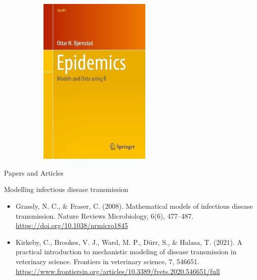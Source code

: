 \documentclass[
  ignorenonframetext,
]{beamer}
\begin{document}
\begin{frame}
\begin{figure}
\begin{minipage}{0.50\linewidth}
\begin{figure}[H]
{\centering \includegraphics[width=0.6\textwidth,height=\textheight]{images/Epidemics_Ottar.jpg}

}


\end{figure}%

\end{minipage}%

\end{figure}%
\end{frame}

\begin{frame}
\begin{block}{Papers and Articles}
\label{papers-and-articles}
\end{block}
\end{frame}

\begin{frame}
\begin{block}{Modelling infectious disease transmission}
\label{modelling-infectious-disease-transmission}
\begin{itemize}
\item
  Grassly, N. C., \& Fraser, C. (2008). Mathematical models of
  infectious disease transmission. Nature Reviews Microbiology, 6(6),
  477--487. \url{https://doi.org/10.1038/nrmicro1845}
\item
  Kirkeby, C., Brookes, V. J., Ward, M. P., Dürr, S., \& Halasa, T.
  (2021). A practical introduction to mechanistic modeling of disease
  transmission in veterinary science. Frontiers in veterinary science,
  7, 546651.
  \url{https://www.frontiersin.org/articles/10.3389/fvets.2020.546651/full}
\end{itemize}
\end{block}
\end{frame}
\end{document}

